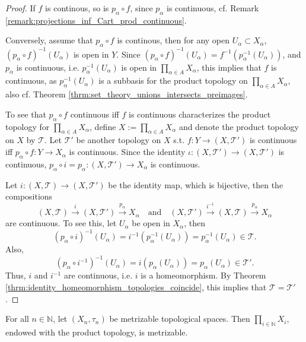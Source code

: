 \begin{proof}
	If $f$ is continous, so is $p_{\alpha}\circ f$, since $p_{\alpha}$ is continuous, cf. Remark \ref{remark:projections_inf_Cart_prod_continuous}. 
	
	Conversely, assume that $p_{\alpha}\circ f$ is continous, then for any open $U_{\alpha}\subset X_{\alpha}$, $(p_{\alpha}\circ f)^{-1}(U_{\alpha})$ is open in $Y$. Since $(p_{\alpha}\circ f)^{-1}(U_{\alpha}) = f^{-1}(p_{\alpha}^{-1}(U_{\alpha}))$, and $p_{\alpha}$ is continuous, i.e. $p_{\alpha}^{-1}(U_{\alpha})$ is open in $\prod_{\alpha\in A}X_{\alpha}$, this implies that $f$ is continuous, as $p_{\alpha}^{-1}(U_{\alpha})$ is a subbasis for the product topology on $\prod_{\alpha\in A}X_{\alpha}$, also cf. Theorem \ref{thrm:set_theory_unions_intersects_preimages}.
	
	To see that $p_{\alpha}\circ f$ continuous iff $f$ is continuous characterizes the product topology for $\prod_{\alpha\in A}X_{\alpha}$, define $X := \prod_{\alpha\in A}X_{\alpha}$ and denote the product topology on $X$ by $\mathscr T$. Let $\mathscr T'$ be another topology on $X$ s.t. $f: Y\to (X, \mathscr T')$ is continuous iff $p_{\alpha}\circ f: Y\to X_{\alpha}$ is continuous. Since the identity $\iota: (X, \mathscr T') \to (X, \mathscr T')$ is continuous, $p_{\alpha}\circ i = p_{\alpha}: (X, \mathscr T')\to X_{\alpha}$ is continuous. 
	
	Let $i: (X, \mathscr T)\to (X, \mathscr T')$ be the identity map, which is bijective, then the compositions
	$$(X, \mathscr T)\overset{i}{\to} (X, \mathscr T') \overset{p_{\alpha}}{\to}X_{\alpha} \quad \text{and}\quad (X, \mathscr T') \overset{i^{-1}}{\to} (X, \mathscr T)\overset{p_{\alpha}}{\to} X_{\alpha}$$
	are continuous. To see this, let $U_{\alpha}$ be open in $X_{\alpha}$, then
	$$(p_{\alpha} \circ i)^{-1}(U_{\alpha}) = i^{-1}\left(p_{\alpha}^{-1}(U_{\alpha})\right) = p_{\alpha}^{-1}(U_{\alpha})\in \mathscr T.$$ 
	Also, $$\left(p_{\alpha}\circ i^{-1}\right)^{-1}(U_{\alpha}) = i(p_{\alpha}(U_{\alpha})) = p_{\alpha}(U_{\alpha})\in \mathscr T'.$$
	Thus, $i$ and $i^{-1}$ are continuous, i.e. $i$ is a homeomorphism. By Theorem \ref{thrm:identity_homeomorphism_topologies_coincide}, this implies that $\mathscr T = \mathscr T'$.
\end{proof}

\begin{theorem}
	For all $n\in\mathbb N$, let $(X_n, \tau_n)$ be metrizable topological spaces. Then $\prod_{i\in\mathbb N}X_i$, endowed with the product topology, is metrizable.
\end{theorem}

